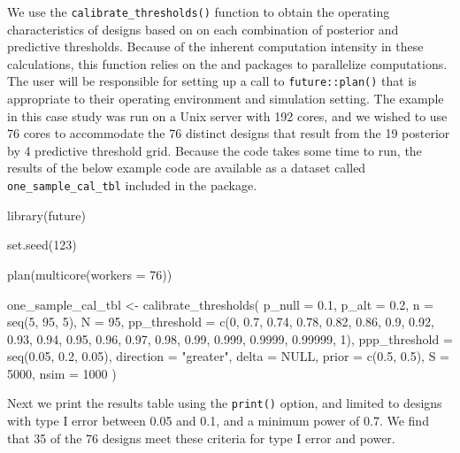We use the \texttt{calibrate\_thresholds()} function to obtain the
operating characteristics of designs based on on each combination of
posterior and predictive thresholds. Because of the inherent computation
intensity in these calculations, this function relies on the
 \citep{Bengtsson2020} and 
\citep{Vaughan2021} packages to parallelize computations. The user will
be responsible for setting up a call to \texttt{future::plan()} that is
appropriate to their operating environment and simulation setting. The
example in this case study was run on a Unix server with 192 cores, and
we wished to use 76 cores to accommodate the 76 distinct designs that
result from the 19 posterior by 4 predictive threshold grid. Because the
code takes some time to run, the results of the below example code are
available as a dataset called \texttt{one\_sample\_cal\_tbl} included in
the  package.

\begin{Schunk}
\begin{Sinput}
library(future)

set.seed(123)

plan(multicore(workers = 76))

one_sample_cal_tbl <- 
  calibrate_thresholds(
    p_null = 0.1, 
    p_alt = 0.2, 
    n = seq(5, 95, 5),
    N = 95, 
    pp_threshold = c(0, 0.7, 0.74, 0.78, 0.82, 0.86, 0.9, 0.92, 0.93, 0.94, 
                     0.95, 0.96, 0.97, 0.98, 0.99, 0.999, 0.9999, 0.99999, 1),
    ppp_threshold = seq(0.05, 0.2, 0.05),
    direction = "greater", 
    delta = NULL, 
    prior = c(0.5, 0.5), 
    S = 5000, 
    nsim = 1000
  )
\end{Sinput}
\end{Schunk}

Next we print the results table using the \texttt{print()} option, and
limited to designs with type I error between 0.05 and 0.1, and a minimum
power of 0.7. We find that 35 of the 76 designs meet these criteria for
type I error and power.

